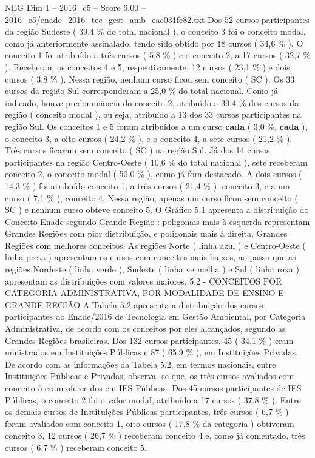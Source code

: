 \begin{textsample}{NEG Dim 1 – 2016\_c5 – Score 6.00 – 2016\_c5/enade\_2016\_tec\_gest\_amb\_eac031fe82.txt}
Dos 52 cursos participantes da região Sudeste ( 39,4 \% do total nacional ), o conceito 3 foi o conceito modal, como já anteriormente assinalado, tendo sido obtido por 18 cursos ( 34,6 \% ).
O conceito 1 foi atribuído a três cursos ( 5,8 \% ) e o conceito 2, a 17 cursos ( 32,7 \% ).
Receberam os conceitos 4 e 5, respectivamente, 12 cursos ( 23,1 \% ) e dois cursos ( 3,8 \% ).
Nessa região, nenhum curso ficou sem conceito ( SC ).
Os 33 cursos da região Sul corresponderam a 25,0 \% do total nacional.
Como já indicado, houve predominância do conceito 2, atribuído a 39,4 \% dos cursos da região ( conceito modal ), ou seja, atribuído a 13 dos 33 cursos participantes na região Sul.
Os conceitos 1 e 5 foram atribuídos a um curso \textbf{cada} ( 3,0 \%, \textbf{cada} ), o conceito 3, a oito cursos ( 24,2 \% ), e o conceito 4, a sete cursos ( 21,2 \% ).
Três cursos ficaram sem conceito ( SC ) na região Sul.
Já dos 14 cursos participantes na região Centro-Oeste ( 10,6 \% do total nacional ), sete receberam conceito 2, o conceito modal ( 50,0 \% ), como já fora destacado.
A dois cursos ( 14,3 \% ) foi atribuído conceito 1, a três cursos ( 21,4 \% ), conceito 3, e a um curso ( 7,1 \% ), conceito 4.
Nessa região, apenas um curso ficou sem conceito ( SC ) e nenhum curso obteve conceito 5.
O Gráfico 5.1 apresenta a distribuição do Conceito Enade segundo Grande Região : poligonais mais à esquerda representam Grandes Regiões com pior distribuição, e poligonais mais à direita, Grandes Regiões com melhores conceitos.
As regiões Norte ( linha azul ) e Centro-Oeste ( linha preta ) apresentam os cursos com conceitos mais baixos, ao passo que as regiões Nordeste ( linha verde ), Sudeste ( linha vermelha ) e Sul ( linha roxa ) apresentam as distribuições com valores maiores. 5.2 - CONCEITOS POR CATEGORIA ADMINISTRATIVA, POR MODALIDADE DE ENSINO E GRANDE REGIÃO A Tabela 5.2 apresenta a distribuição dos cursos participantes do Enade/2016 de Tecnologia em Gestão Ambiental, por Categoria Administrativa, de acordo com os conceitos por eles alcançados, segundo as Grandes Regiões brasileiras.
Dos 132 cursos participantes, 45 ( 34,1 \% ) eram ministrados em Instituições Públicas e 87 ( 65,9 \% ), em Instituições Privadas.
De acordo com as informações da Tabela 5.2, em termos nacionais, entre Instituições Públicas e Privadas, observa -se que, os três cursos avaliados com conceito 5 eram oferecidos em IES Públicas.
Dos 45 cursos participantes de IES Públicas, o conceito 2 foi o valor modal, atribuído a 17 cursos ( 37,8 \% ).
Entre os demais cursos de Instituições Públicas participantes, três cursos ( 6,7 \% ) foram avaliados com conceito 1, oito cursos ( 17,8 \% da categoria ) obtiveram conceito 3, 12 cursos ( 26,7 \% ) receberam conceito 4 e, como já comentado, três cursos ( 6,7 \% ) receberam conceito 5.

\end{textsample}
